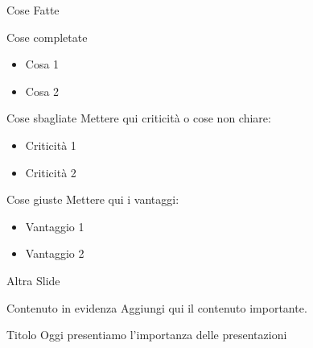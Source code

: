 \documentclass{beamer}
\begin{document}
\begin{frame}{Cose Fatte}
    \begin{block}{Cose completate}
        \begin{itemize}
            \item Cosa 1
            \item Cosa 2
        \end{itemize}
    \end{block}

    \begin{alertblock}{Cose sbagliate}
        Mettere qui criticità o cose non chiare:
        \begin{itemize}
            \item Criticità 1
            \item Criticità 2
        \end{itemize}
    \end{alertblock}

    \begin{exampleblock}{Cose giuste}
        Mettere qui i vantaggi:
        \begin{itemize}
            \item Vantaggio 1
            \item Vantaggio 2
        \end{itemize}
    \end{exampleblock}
\end{frame}

\begin{frame}{Altra Slide}
    \begin{block}{Contenuto in evidenza}
        Aggiungi qui il contenuto importante.
    \end{block}
\end{frame}

\begin{frame}{Titolo}
    Oggi presentiamo l'importanza delle presentazioni
\end{frame}
\end{document}
